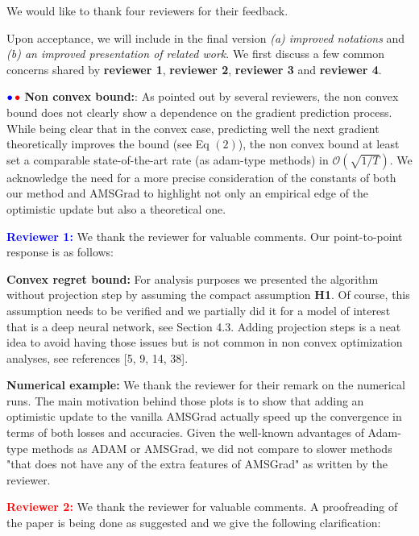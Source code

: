 \documentclass{article}
\begin{document}
We would like to thank four reviewers for their feedback. 

Upon acceptance, we will include in the final version \emph{{\sf (a)} improved notations} and \emph{{\sf (b)} an improved presentation of related work}. 
We first discuss a few common concerns shared by \textbf{\color{blue}reviewer 1}, \textbf{\color{red} reviewer 2}, \textbf{\color{green!50!black}reviewer 3} and \textbf{\color{yellow!50!black}reviewer 4}.



${\color{blue}\bullet}\!~{\color{red}\bullet}$ \textbf{Non convex bound:}: 
As pointed out by several reviewers, the non convex bound does not clearly show a dependence on the gradient prediction process.
While being clear that in the convex case, predicting well the next gradient theoretically improves the bound (see Eq $(2)$), the non convex bound at least set a comparable state-of-the-art rate (as adam-type methods) in $\mathcal{O}( \sqrt{1/T} )$.
We acknowledge the need for a more precise consideration of the constants of both our method and AMSGrad to highlight not only an empirical edge of the optimistic update but also a theoretical one.


\textbf{\textcolor{blue}{Reviewer 1:}} We thank the reviewer for valuable comments. Our point-to-point response is as follows:


\textbf{Convex regret bound:} 
For analysis purposes we presented the algorithm without projection step by assuming the compact assumption \textbf{H1}.
Of course, this assumption needs to be verified and we partially did it for a model of interest that is a deep neural network, see Section 4.3.
Adding projection steps is a neat idea to avoid having those issues but is not common in non convex optimization analyses, see references [5, 9, 14, 38].

\textbf{Numerical example:} We thank the reviewer for their remark on the numerical runs. 
The main motivation behind those plots is to show that adding an optimistic update to the vanilla AMSGrad actually speed up the convergence in terms of both losses and accuracies.
Given the well-known advantages of Adam-type methods as ADAM or AMSGrad, we did not compare to slower methods "that does not have any of the extra features of AMSGrad" as written by the reviewer.


\textbf{\textcolor{red}{Reviewer 2:}} We thank the reviewer for valuable comments. A proofreading of the paper is being done as suggested and we give the following clarification:
\end{document}
